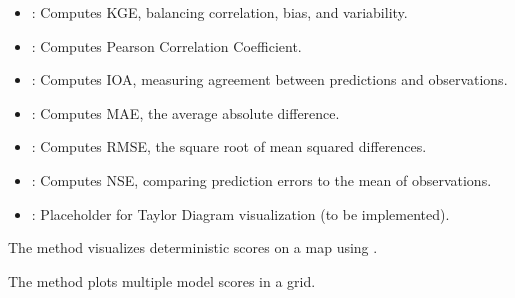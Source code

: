 \documentclass[letterpaper,10pt,english]{sphinxmanual}
\begin{document}
\sphinxAtStartPar
{}
\begin{itemize}
\item {} 
\sphinxAtStartPar
{}: Computes KGE, balancing correlation, bias, and variability.

\item {} 
\sphinxAtStartPar
{}: Computes Pearson Correlation Coefficient.

\item {} 
\sphinxAtStartPar
{}: Computes IOA, measuring agreement between predictions and observations.

\item {} 
\sphinxAtStartPar
{}: Computes MAE, the average absolute difference.

\item {} 
\sphinxAtStartPar
{}: Computes RMSE, the square root of mean squared differences.

\item {} 
\sphinxAtStartPar
{}: Computes NSE, comparing prediction errors to the mean of observations.

\item {} 
\sphinxAtStartPar
{}: Placeholder for Taylor Diagram visualization (to be implemented).

\end{itemize}

\sphinxAtStartPar
{}

\sphinxAtStartPar
The  method visualizes deterministic scores on a map using .

\begin{sphinxVerbatim}[commandchars=\\\{\}]
   
\end{sphinxVerbatim}

\sphinxAtStartPar
The  method plots multiple model scores in a grid.
\end{document}
